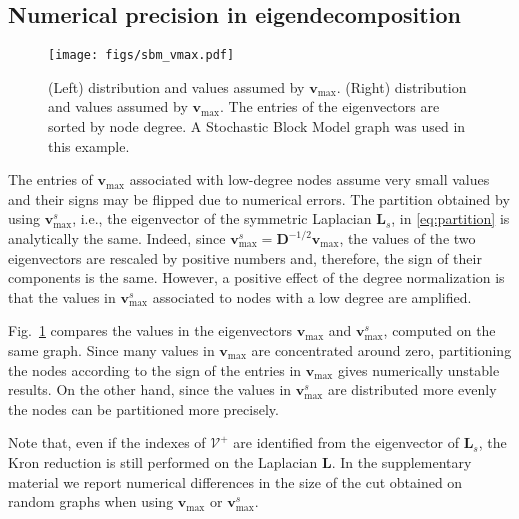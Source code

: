 \documentclass[journal]{IEEEtran}
\def\v{{\mathbf v}}
\def\L{{\mathbf L}}
\def\D{{\mathbf D}}
\begin{document}
\subsection{Numerical precision in eigendecomposition}
\begin{figure}[!ht]
    \centering
    \texttt{[image: figs/sbm\_vmax.pdf]}    
    \caption{(Left) distribution and values assumed by $\v_\text{max}$. (Right) distribution and values assumed by $\v_\text{max}$. The entries of the eigenvectors are sorted by node degree. A Stochastic Block Model graph was used in this example.}
    \label{fig:v_max}
\end{figure}
The entries of $\v_\text{max}$ associated with low-degree nodes assume very small values and their signs may be flipped due to numerical errors.
The partition obtained by using $\v^s_\text{max}$, i.e., the eigenvector of the symmetric Laplacian $\L_s$, in \eqref{eq:partition} is analytically the same.
Indeed, since $\v^s_\text{max} = \D^{-1/2} \v_\text{max}$, the values of the two eigenvectors are rescaled by positive numbers and, therefore, the sign of their components is the same.
However, a positive effect of the degree normalization is that the values in $\v^s_\text{max}$ associated to nodes with a low degree are amplified.

Fig.~\ref{fig:v_max} compares the values in the eigenvectors $\v_\text{max}$ and $\v^s_\text{max}$, computed on the same graph.
Since many values in $\v_\text{max}$ are concentrated around zero, partitioning the nodes according to the sign of the entries in $\v_\text{max}$ gives numerically unstable results.
On the other hand, since the values in $\v^s_\text{max}$ are distributed more evenly the nodes can be partitioned more precisely. 

Note that, even if the indexes of $\mathcal{V}^{+}$ are identified from the eigenvector of $\L_s$, the Kron reduction is still performed on the Laplacian $\L$.
In the supplementary material we report numerical differences in the size of the cut obtained on random graphs when using $\v_\text{max}$ or $\v^s_\text{max}$.
\end{document}
